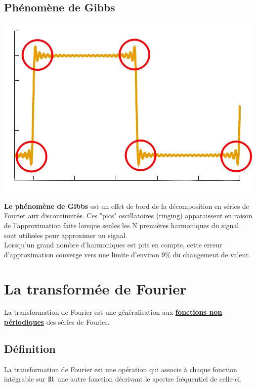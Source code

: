 \subsection*{Phénomène de Gibbs}
\begin{minipage}{0.4\textwidth}
\includegraphics[width=\textwidth]{part01/chap06/gibbs.png}
\end{minipage}
\hfill
\begin{minipage}{0.5\textwidth}
\textbf{Le phénomène de Gibbs} est un effet de bord de la décomposition en séries de Fourier aux discontinuités. Ces "pics" oscillatoires (ringing) apparaissent en raison de l'approximation faite lorsque seules les N premières harmoniques du signal sont utilisées pour approximer un signal.\\

Lorsqu'un grand nombre d'harmoniques est pris en compte, cette erreur d'approximation converge vers une limite d'environ 9\% du changement de valeur.
\end{minipage}

\section{La transformée de Fourier}

La transformation de Fourier est une généralisation aux \textbf{\underline{fonctions non périodiques}} des séries de Fourier.

\subsection*{Définition}

La transformation de Fourier est une opération qui associe à chaque fonction intégrable sur ${\rm I\!R}$ une autre fonction décrivant le spectre fréquentiel de celle-ci. \\

